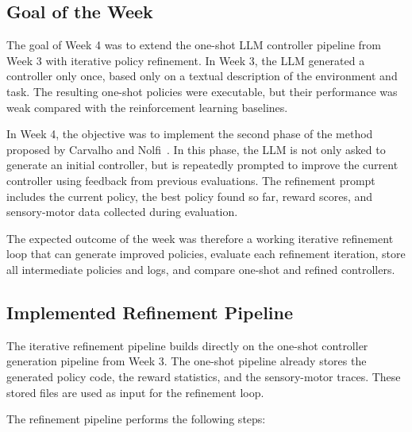 \documentclass[11pt,a4paper]{article}
\begin{document}
\subsection{Goal of the Week}

The goal of Week 4 was to extend the one-shot LLM controller pipeline from Week 3 with iterative policy refinement. In Week 3, the LLM generated a controller only once, based only on a textual description of the environment and task. The resulting one-shot policies were executable, but their performance was weak compared with the reinforcement learning baselines.

In Week 4, the objective was to implement the second phase of the method proposed by Carvalho and Nolfi~\cite{carvalho2026}. In this phase, the LLM is not only asked to generate an initial controller, but is repeatedly prompted to improve the current controller using feedback from previous evaluations. The refinement prompt includes the current policy, the best policy found so far, reward scores, and sensory-motor data collected during evaluation.

The expected outcome of the week was therefore a working iterative refinement loop that can generate improved policies, evaluate each refinement iteration, store all intermediate policies and logs, and compare one-shot and refined controllers.

\subsection{Implemented Refinement Pipeline}

The iterative refinement pipeline builds directly on the one-shot controller generation pipeline from Week 3. The one-shot pipeline already stores the generated policy code, the reward statistics, and the sensory-motor traces. These stored files are used as input for the refinement loop.

The refinement pipeline performs the following steps:
\end{document}
